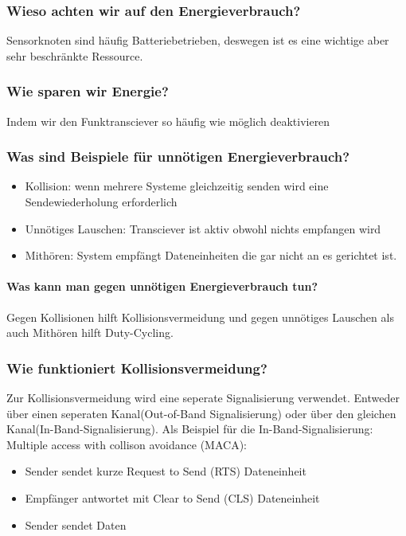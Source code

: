 	\subsubsection{Wieso achten wir auf den Energieverbrauch?}
	Sensorknoten sind häufig Batteriebetrieben, deswegen ist es eine wichtige aber sehr beschränkte Ressource.
	
	\subsubsection{Wie sparen wir Energie?}
	Indem wir den Funktransciever so häufig wie möglich deaktivieren
	
	\subsubsection{Was sind Beispiele für unnötigen Energieverbrauch?}
	\begin{itemize}
		\item Kollision: wenn mehrere Systeme gleichzeitig senden wird eine Sendewiederholung erforderlich
		\item Unnötiges Lauschen: Transciever ist aktiv obwohl nichts empfangen wird
		\item Mithören: System empfängt Dateneinheiten die gar nicht an es gerichtet ist.
	\end{itemize}
	\paragraph{Was kann man gegen unnötigen Energieverbrauch tun?}
	Gegen Kollisionen hilft Kollisionsvermeidung und gegen unnötiges Lauschen als auch Mithören hilft Duty-Cycling.
	
	\subsubsection{Wie funktioniert Kollisionsvermeidung?}
	Zur Kollisionsvermeidung wird eine seperate Signalisierung verwendet. Entweder über einen seperaten Kanal(Out-of-Band Signalisierung) oder über den gleichen Kanal(In-Band-Signalisierung). 
	Als Beispiel für die In-Band-Signalisierung: Multiple access with collison avoidance (MACA):
	\begin{itemize}
		\item Sender sendet kurze Request to Send (RTS) Dateneinheit
		\item Empfänger antwortet mit Clear to Send (CLS) Dateneinheit
		\item Sender sendet Daten
	\end{itemize}
	
